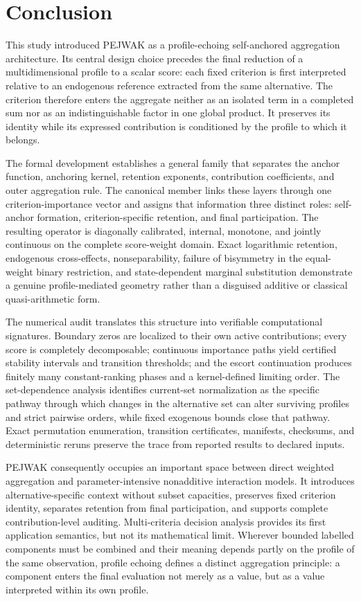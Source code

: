\documentclass[reqno,11pt]{amsart}
\theoremstyle{definition}
\theoremstyle{plain}
\theoremstyle{remark}
\begin{document}
\section{Conclusion}
\label{sec:conclusion}

This study introduced PEJWAK as a profile-echoing self-anchored
aggregation architecture. Its central design choice precedes the final
reduction of a multidimensional profile to a scalar score: each fixed
criterion is first interpreted relative to an endogenous reference
extracted from the same alternative. The criterion therefore enters the
aggregate neither as an isolated term in a completed sum nor as an
indistinguishable factor in one global product. It preserves its identity
while its expressed contribution is conditioned by the profile to which
it belongs.

The formal development establishes a general family that separates the
anchor function, anchoring kernel, retention exponents, contribution
coefficients, and outer aggregation rule. The canonical member links
these layers through one criterion-importance vector and assigns that
information three distinct roles: self-anchor formation,
criterion-specific retention, and final participation. The resulting
operator is diagonally calibrated, internal, monotone, and jointly
continuous on the complete score-weight domain. Exact logarithmic
retention, endogenous cross-effects, nonseparability, failure of
bisymmetry in the equal-weight binary restriction, and state-dependent
marginal substitution demonstrate a genuine profile-mediated geometry
rather than a disguised additive or classical quasi-arithmetic form.

The numerical audit translates this structure into verifiable
computational signatures. Boundary zeros are localized to their own
active contributions; every score is completely decomposable; continuous
importance paths yield certified stability intervals and transition
thresholds; and the escort continuation produces finitely many
constant-ranking phases and a kernel-defined limiting order. The
set-dependence analysis identifies current-set normalization as the
specific pathway through which changes in the alternative set can alter
surviving profiles and strict pairwise orders, while fixed exogenous
bounds close that pathway. Exact permutation enumeration, transition
certificates, manifests, checksums, and deterministic reruns preserve the
trace from reported results to declared inputs.

PEJWAK consequently occupies an important space between direct weighted
aggregation and parameter-intensive nonadditive interaction models. It
introduces alternative-specific context without subset capacities,
preserves fixed criterion identity, separates retention from final
participation, and supports complete contribution-level auditing.
Multi-criteria decision analysis provides its first application
semantics, but not its mathematical limit. Wherever bounded labelled
components must be combined and their meaning depends partly on the
profile of the same observation, profile echoing defines a distinct
aggregation principle: a component enters the final evaluation not merely
as a value, but as a value interpreted within its own profile.
\end{document}

